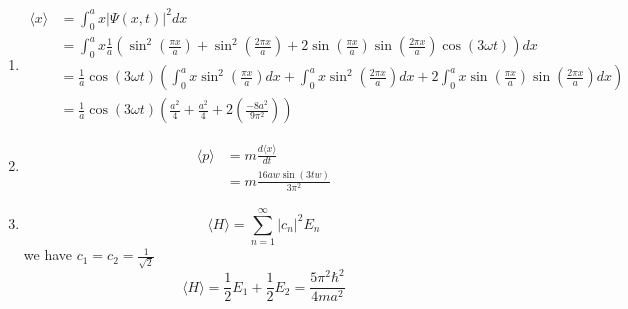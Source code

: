 \documentclass{article}
\begin{document}
\begin{enumerate}[label=(\alph*)]
        \item 
        \begin{align}
            \langle x \rangle &= \int_{0}^{a} x |\Psi(x,t)|^2 dx \\
            &= \int_{0}^{a} x \frac{1}{a} \left(\sin^2\left(\frac{\pi x }{a}\right) + \sin^2 \left(\frac{2 \pi x}{a}\right) + 2\sin\left(\frac{\pi x}{a}\right)\sin\left(\frac{2 \pi x}{a}\right)\cos\left(3 \omega t\right)\right) dx \\
            &= \frac{1}{a} \cos\left(3 \omega t\right) \left(\int_{0}^{a} x \sin^2\left(\frac{\pi x }{a}\right) dx + \int_{0}^{a} x \sin^2 \left(\frac{2 \pi x}{a}\right) dx + 2\int_{0}^{a} x \sin\left(\frac{\pi x}{a}\right)\sin\left(\frac{2 \pi x}{a}\right) dx\right) \\
            &= \frac{1}{a} \cos\left(3 \omega t\right) \left(\frac{a^2}{4} + \frac{a^2}{4} + 2\left(\frac{-8a^2}{9\pi^2}\right)\right)
        \end{align}
        \item 
        \begin{align}
            \langle p \rangle &= m \frac{d \langle x \rangle}{dt} \\
            &= m\frac{16 a w \sin\left(3 t w\right)}{3 \pi^2}
        \end{align}
        \item
        \[\langle H \rangle = \sum_{n=1}^{\infty} |c_n|^2E_n\]
        we have \(c_1 = c_2 = \frac{1}{\sqrt{2}}\)
        \[\langle H \rangle = \frac{1}{2}E_1 + \frac{1}{2}E_2 = \frac{5 \pi^2 \hbar^2}{4ma^2} \]
    \end{enumerate}
\endgroup
\end{document}
